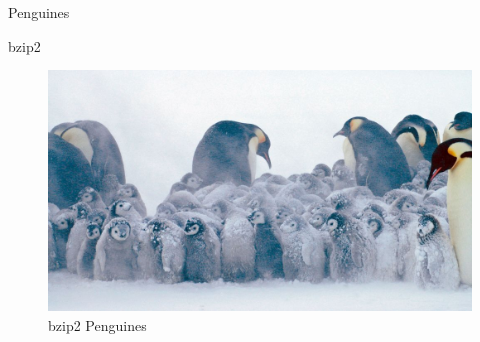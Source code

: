 \documentclass[10pt, compress]{beamer}
\begin{document}
\begin{frame}{Penguines}
\begin{figure}[h]
	\centering
\end{figure}
\end{frame}


\begin{frame}{bzip2}
\begin{figure}[h]
	\centering
	\includegraphics[scale=0.25, angle=5]{pics/bzip2penguin.jpg}
	\caption{bzip2 Penguines}
\end{figure}
\end{frame}
\end{document}
